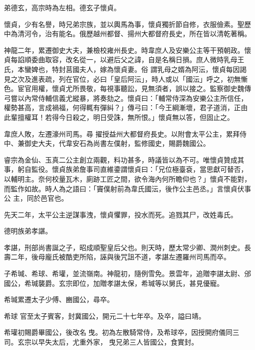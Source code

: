 \begin{pinyinscope}
 弟德玄，高宗時為左相。德玄子懷貞。



 懷貞，少有名譽，時兄弟宗族，並以輿馬為事，懷貞獨折節自修，衣服儉素。聖歷中為清河令，治有能名。俄歷越州都督、揚州大都督府長史，所在皆以清乾著稱。



 神龍二年，累遷御史大夫，兼檢校雍州長史。時韋庶人及安樂公主等干預朝政。懷貞每諂順委曲取容，改名從一，以避后父之諱，自是名稱日損。庶人微時乳母王氏，本蠻婢也，特封莒國夫人，嫁為懷貞妻。俗
 謂乳母之婿為阿沄，懷貞每因謁見之次及進表疏，列在官位，必曰「皇后阿沄」，時人或以「國沄」呼之，初無慚色。宦官用權，懷貞尤所畏敬，每視事聽訟，見無須者，誤以接之。監察御史魏傳弓嘗以內常侍輔信義尤縱暴，將奏劾之。懷貞曰：「輔常侍深為安樂公主所信任，權勢甚高，言成禍福，何得輒有彈糾？」傳弓曰：「今王綱漸壞，君子道消，正由此輩擅權耳！若得今日殺之，明日受誅，無所恨。」懷貞無以答，但固止之。



 韋庶人敗，左遷濠州司馬。尋
 擢授益州大都督府長史。以附會太平公主，累拜侍中、兼御史大夫，代韋安石為尚書左僕射，監修國史，賜爵魏國公。



 睿宗為金仙、玉真二公主創立兩觀，料功甚多，時議皆以為不可。唯懷貞贊成其事，躬自監役。懷貞族弟詹事司直維鍌謂懷貞曰：「兄位極臺袞，當思獻可替否，以輔明主。奈何校量瓦木，廁跡工匠之間，欲令海內何所瞻仰也？」懷貞不能對，而監作如故。時人為之語曰：「竇僕射前為韋氏國沄，後作公主邑丞。」言懷貞伏事公
 主，同於邑官也。



 先天二年，太平公主逆謀事洩，懷貞懼罪，投水而死。追戮其尸，改姓毒氏。



 德明族弟孝諶。



 孝諶，刑部尚書誕之子，昭成順聖皇后父也。則天時，歷太常少卿、潤州刺史。長壽二年，後母龐氏被酷吏所陷，誣與後咒詛不道，孝諶左遷羅州司馬而卒。



 子希瑊、希球、希瓘，並流嶺南。神龍初，隨例雪免。景雲年，追贈李諶太尉、邠國公，希瑊襲爵。玄宗即位，加贈孝諶太保，希瑊等以舅氏，甚見優寵。



 希瑊累遷太子少傅、豳國公，尋卒。



 希球
 官至太子賓客，封冀國公，開元二十七年卒。及卒，謚曰靖。



 希瓘初賜爵畢國公，後改名曳。初為左散騎常侍，及希球卒，因授開府儀同三司。玄宗以早失太后，尤重外家，曳兄弟三人皆國公，食實封。




\end{pinyinscope}
